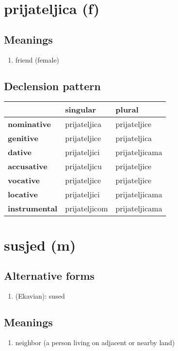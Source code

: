 \filbreak
\section{prijateljica (f)}
\subsection*{Meanings}
\begin{enumerate}
\item friend (female)
\end{enumerate}
\subsection*{Declension pattern}
\begin{tabularx}{\linewidth}{Xll}
\toprule
{} &       singular &          plural \\
\midrule
\textbf{nominative  } &   prijateljica &    prijateljice \\
\textbf{genitive    } &   prijateljice &    prijateljica \\
\textbf{dative      } &   prijateljici &  prijateljicama \\
\textbf{accusative  } &   prijateljicu &    prijateljice \\
\textbf{vocative    } &   prijateljice &    prijateljice \\
\textbf{locative    } &   prijateljici &  prijateljicama \\
\textbf{instrumental} &  prijateljicom &  prijateljicama \\
\bottomrule
\end{tabularx}

\filbreak
\section{susjed (m)}
\subsection*{Alternative forms}
\begin{enumerate}
\item (Ekavian): sused
\end{enumerate}
\subsection*{Meanings}
\begin{enumerate}
\item neighbor (a person living on adjacent or nearby land)
\end{enumerate}
